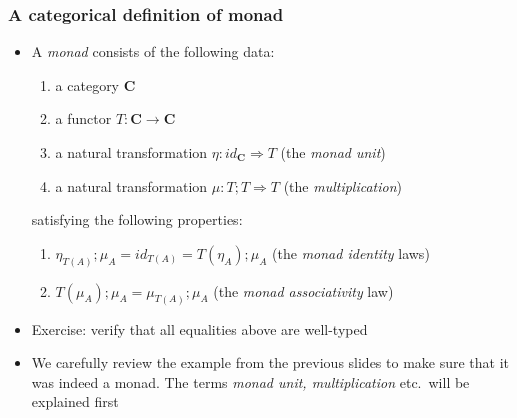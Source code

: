 \documentclass[handout]{beamer}
\newcommand{\To}{\Rightarrow}
\newcommand{\bfsf}[1]{{\boldsymbol{#1}}}
\newcommand{\CC}{\bfsf{C}}
\begin{document}
\frame
  {   
    \frametitle{A categorical definition of monad}\label{Mon5:CatDefMonad}

 \begin{itemize}[<+->]
\item A \emph{monad} consists of the following data:
 \begin{enumerate}
    \item a category $\CC$
    \item a functor $T:\CC\to\CC$
    \item a natural transformation $\eta: id_\CC \To T$ (the \emph{monad unit})
    \item a natural transformation $\mu: T;T \To T$ (the \emph{multiplication})
 \end{enumerate}
satisfying the following properties:
 \begin{enumerate}
    \item $\eta_{T(A)};\mu_A = id_{T(A)} = T(\eta_A);\mu_A$ (the \emph{monad identity} laws)
    \item $T(\mu_A);\mu_A = \mu_{T(A)};\mu_A$ (the \emph{monad associativity} law)
 \end{enumerate}
\item Exercise: verify that all equalities above are well-typed
\item We carefully review the example from the previous slides to 
make sure that it was indeed a monad. 
The terms \emph{monad unit, multiplication} etc.\ will be explained first
 \end{itemize}

 }
\end{document}
